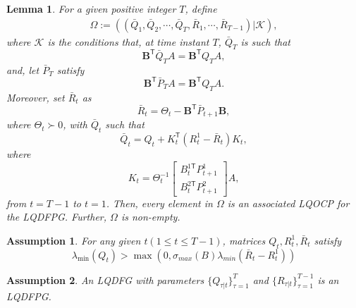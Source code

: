 \documentclass[letterpaper, 10 pt, conference]{ieeeconf}  %
\newcommand{\transpose}{\mathsf{T}}
\newtheorem{lemma}{Lemma}
\newtheorem{assumption}{Assumption}
\begin{document}
\begin{lemma}
    \cite[Theorem 5]{prasad_structure_2023}
    For a given positive integer $T$, define
    \begin{align*}
        \Omega := ((\bar{Q}_{1},\bar{Q}_{2},\cdots,\bar{Q}_{T},\bar{R}_{1},\cdots,\bar{R}_{T-1})|\mathcal{K}),
    \end{align*}
    where $\mathcal{K}$ is the conditions that, at time instant $T$, $\bar{Q}_{T}$ is such that
        \begin{equation}
            \mathbf{B}^{\transpose}\bar{Q}_{T}A = \mathbf{B}^{\transpose}Q_{T}A,
        \end{equation}
        and, let $\bar{P}_{T}$ satisfy
        \begin{equation}
            \mathbf{B}^{\transpose}\bar{P}_{T}A = \mathbf{B}^{\transpose}Q_{T}A.
        \end{equation}
        Moreover, set $\bar{R}_{t}$ as
        \begin{equation}\label{eq:matrixR}
            \bar{R}_{t} = \Theta_{t} - \mathbf{B}^{\transpose}\bar{P}_{t+1}\mathbf{B},
        \end{equation}
        where $\Theta_{t} \succ 0$,
        with $\bar{Q}_{t}$ such that
        \begin{equation}
            \bar{Q}_{t} = Q_{t} + K_{t}^{\transpose}(R_{t}^{1}-\bar{R}_{t})K_{t},
        \end{equation}
        where
        \begin{equation}
            K_{t} = \Theta_{t}^{-1}
            \begin{bmatrix}
                B_{t}^{1\transpose}P_{t+1}^{1}\\
                B_{t}^{2\transpose}P_{t+1}^{2}
            \end{bmatrix}
            A,
        \end{equation}
        from $t=T-1$ to $t=1$.
    Then, every element in $\Omega$ is an associated LQOCP for the LQDFPG. Further, $\Omega$ is non-empty.
\end{lemma}
\begin{assumption}\label{assumption:lowerQ}
    For any given $t(1\leq t \leq T-1)$, matrices $Q_{t}, R_{t}^{1}, \bar{R}_{t}$ satisfy
    \begin{equation}
        \lambda_{\min}(Q_{t}) > \max(0,\sigma_{max}(B)\lambda_{min}(\bar{R}_{t}-R_{t}^{1}))
    \end{equation}
\end{assumption}
\begin{assumption}\label{assumption:DGparameters}
    An LQDFG with parameters $\{Q_{\tau|t}\}_{\tau=1}^{T}$ and $\{R_{\tau|t}\}_{\tau=1}^{T-1}$ is an LQDFPG.
\end{assumption}
\end{document}
